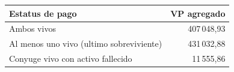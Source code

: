\begin{tabular}{@{}lr@{}}
\toprule
Estatus de pago & VP agregado \\
\midrule
Ambos vivos & 407\,048,93 \\
Al menos uno vivo (ultimo sobreviviente) & 431\,032,88 \\
Conyuge vivo con activo fallecido & 11\,555,86 \\
\bottomrule
\end{tabular}
